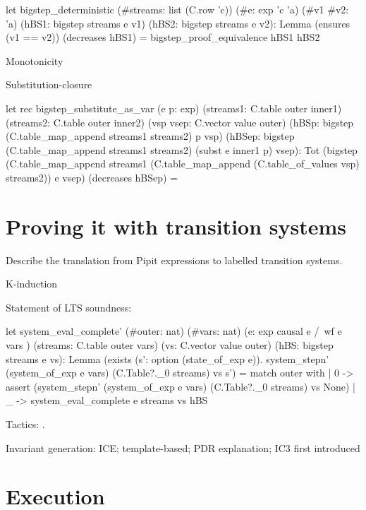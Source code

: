 \documentclass[sigplan,screen]{acmart}
\begin{document}
\begin{code}
let bigstep_deterministic
  (#streams: list (C.row 'c))
  (#e: exp 'c 'a)
  (#v1 #v2: 'a)
  (hBS1: bigstep streams e v1) (hBS2: bigstep streams e v2):
    Lemma (ensures (v1 == v2)) (decreases hBS1) =
  bigstep_proof_equivalence hBS1 hBS2
\end{code}

Monotonicity

Substitution-closure
\begin{code}
let rec bigstep_substitute_as_var (e p: exp)
  (streams1: C.table outer inner1)
  (streams2: C.table outer inner2)
  (vsp vsep: C.vector value outer)
  (hBSp: bigstep (C.table_map_append streams1 streams2) p vsp)
  (hBSep: bigstep (C.table_map_append streams1 streams2) (subst e inner1 p) vsep):
    Tot (bigstep (C.table_map_append streams1 (C.table_map_append (C.table_of_values vsp) streams2)) e vsep) (decreases hBSep) =

\end{code}



\section{Proving it with transition systems}

Describe the translation from Pipit expressions to labelled transition systems.

K-induction

Statement of LTS soundness:
\begin{code}
let system_eval_complete'
    (#outer: nat) (#vars: nat)
    (e: exp { causal e /\ wf e vars })
    (streams: C.table outer vars)
    (vs: C.vector value outer)
    (hBS: bigstep streams e vs):
      Lemma (exists (s': option (state_of_exp e)).
        system_stepn'
          (system_of_exp e vars)
          (C.Table?._0 streams) vs s') =
    match outer with
    | 0 -> assert
      (system_stepn'
        (system_of_exp e vars)
        (C.Table?._0 streams) vs None)
    | _ -> system_eval_complete e streams vs hBS
\end{code}

Tactics: \cite{martinez2019meta}.

Invariant generation: ICE\cite{garg2014ice}; template-based\cite{kahsai2011instantiation}; PDR explanation\cite{een2011efficient}; IC3 first introduced\cite{bradley2011sat}

\section{Execution}
\end{document}
